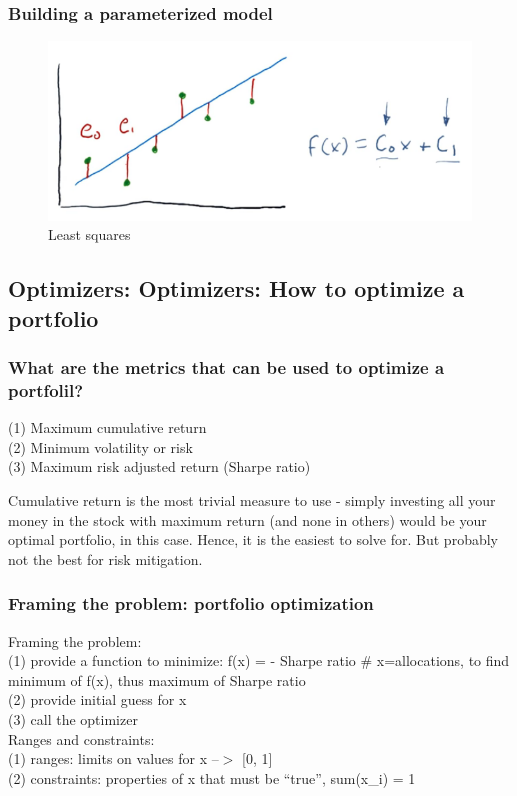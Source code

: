 \documentclass[12pt]{article}
\newcommand{\q}[1]{``#1''}
\begin{document}
\subsubsection{Building a parameterized model}       
\begin{figure}[!h]
\centering
\includegraphics[scale=0.4]{fig/fig23}
\caption{Least squares}
\end{figure}

\subsection{Optimizers: Optimizers: How to optimize a portfolio}

\subsubsection{What are the metrics that can be used to optimize a portfolil?} 

(1) Maximum cumulative return \\
(2) Minimum volatility or risk \\
(3) Maximum risk adjusted return (Sharpe ratio) 

Cumulative return is the most trivial measure to use - simply investing all your money in the stock with maximum return (and none in others) would be your optimal portfolio, in this case. Hence, it is the easiest to solve for. But probably not the best for risk mitigation.

\subsubsection{Framing the problem: portfolio optimization} 

\noindent
Framing the problem: \\
(1) provide a function to minimize: f(x) = - Sharpe ratio \# x=allocations, to find minimum of f(x), thus maximum of Sharpe ratio \\
(2) provide initial guess for x \\
(3) call the optimizer \\ [5pt]
\noindent
Ranges and constraints: \\
(1) ranges: limits on values for x --$>$ [0, 1] \\
(2) constraints: properties of x that must be \q{true}, sum(x\_i) = 1
\end{document}
